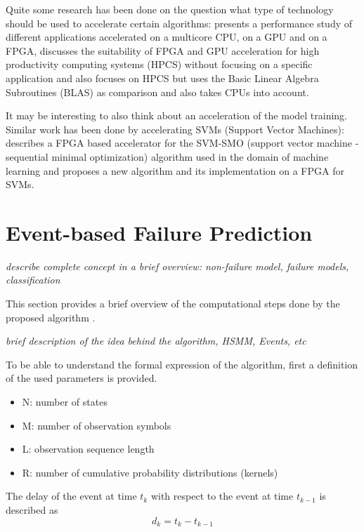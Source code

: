 \documentclass[mscthesis]{usiinfthesis}
\begin{document}
Quite some research has been done on the question what type of technology
should be used to accelerate certain algorithms: \cite{SASP08_Che} presents
a performance study of different applications accelerated on a multicore CPU,
on a GPU and on a FPGA, \cite{FPL10_Jones} discusses the suitability of FPGA
and GPU acceleration for high productivity computing systems (HPCS) without
focusing on a specific application and \cite{ISVLSI10_Kestur} also focuses on
HPCS but uses the Basic Linear Algebra Subroutines (BLAS) as comparison and
also takes CPUs into account.

It may be interesting to also think about an acceleration of the model
training. Similar work has been done by accelerating SVMs (Support Vector Machines):
\cite{FCCM09_Cadambi} describes a FPGA based accelerator for the SVM-SMO
(support vector machine - sequential minimal optimization) algorithm used in
the domain of machine learning and \cite{IEEE03_Anguita} proposes a new algorithm
and its implementation on a FPGA for SVMs.

\chapter{Event-based Failure Prediction}
\label{ch:event}

\emph{\color{red} describe complete concept in a brief overview: non-failure
model, failure models, classification}

This section provides a brief overview of the computational steps done by the
proposed algorithm \cite{salfner08}.

\emph{\color{red}brief description of the idea behind the algorithm, HSMM, Events, etc}

To be able to understand the formal expression of the algorithm, first
a definition of the used parameters is provided.
\begin{itemize}
    \item N: number of states
    \item M: number of observation symbols
    \item L: observation sequence length
    \item R: number of cumulative probability distributions (kernels)
\end{itemize}
The delay of the event at time $ t_k $ with respect to the event at time
$ t_{k-1} $ is described as
\begin{equation}
\label{eq:delay}
    d_k = t_k-t_{k-1}
\end{equation}
\end{document}
